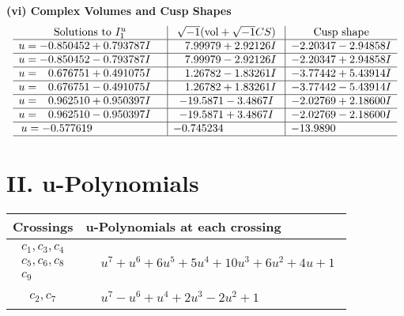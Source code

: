 \documentclass[1p]{elsarticle_modified}
\theoremstyle{definition}
\newcommand{\I}{\sqrt{-1}}
\begin{document}
\newpage\flushleft \textbf{(vi) Complex Volumes and Cusp Shapes}
$$\begin{array}{c|c|c}  
\text{Solutions to }I^u_{1}& \I (\text{vol} + \sqrt{-1}CS) & \text{Cusp shape}\\
 \hline 
\begin{aligned}
u &= -0.850452 + 0.793787 I\end{aligned}
 & \phantom{-}7.99979 + 2.92126 I & -2.20347 - 2.94858 I \\ \hline\begin{aligned}
u &= -0.850452 - 0.793787 I\end{aligned}
 & \phantom{-}7.99979 - 2.92126 I & -2.20347 + 2.94858 I \\ \hline\begin{aligned}
u &= \phantom{-}0.676751 + 0.491075 I\end{aligned}
 & \phantom{-}1.26782 - 1.83261 I & -3.77442 + 5.43914 I \\ \hline\begin{aligned}
u &= \phantom{-}0.676751 - 0.491075 I\end{aligned}
 & \phantom{-}1.26782 + 1.83261 I & -3.77442 - 5.43914 I \\ \hline\begin{aligned}
u &= \phantom{-}0.962510 + 0.950397 I\end{aligned}
 & -19.5871 - 3.4867 I & -2.02769 + 2.18600 I \\ \hline\begin{aligned}
u &= \phantom{-}0.962510 - 0.950397 I\end{aligned}
 & -19.5871 + 3.4867 I & -2.02769 - 2.18600 I \\ \hline\begin{aligned}
u &= -0.577619\phantom{ +0.000000I}\end{aligned}
 & -0.745234\phantom{ +0.000000I} & -13.9890\phantom{ +0.000000I}\\
 \hline 
 \end{array}$$\newpage
\newpage\renewcommand{\arraystretch}{1}
\centering \section*{ II. u-Polynomials}
\begin{tabular}{m{50pt}|m{274pt}}
Crossings & \hspace{64pt}u-Polynomials at each crossing \\
\hline $$\begin{aligned}c_{1},c_{3},c_{4}\\c_{5},c_{6},c_{8}\\c_{9}\end{aligned}$$&$\begin{aligned}
&u^7+u^6+6 u^5+5 u^4+10 u^3+6 u^2+4 u+1
\end{aligned}$\\
\hline $$\begin{aligned}c_{2},c_{7}\end{aligned}$$&$\begin{aligned}
&u^7- u^6+u^4+2 u^3-2 u^2+1
\end{aligned}$\\
\hline
\end{tabular}\newpage\renewcommand{\arraystretch}{1}
\end{document}
